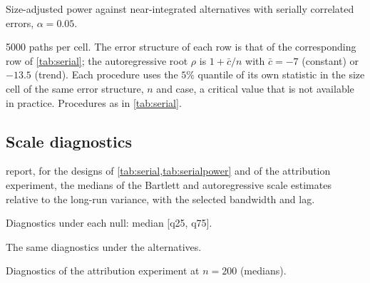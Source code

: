 \documentclass[11pt]{article}
\newcommand{\cbar}{\bar{c}}
\begin{document}
\begin{table}[h]
\centering
\caption{Size-adjusted power against near-integrated alternatives with
serially correlated errors, $\alpha = 0.05$.}
\label{tab:serialpower}
\footnotesize
\resizebox{\textwidth}{!}{%
}
\par\medskip\begin{minipage}{\textwidth}\footnotesize
5000 paths per cell. The error structure of each row is that of the
corresponding row of \cref{tab:serial}; the autoregressive root $\rho$ is
$1 + \cbar/n$ with $\cbar = -7$ (constant) or $-13.5$ (trend). Each
procedure uses the $5\%$ quantile of its own statistic in the size cell
of the same error structure, $n$ and case, a critical value that is not
available in practice. Procedures as in \cref{tab:serial}.
\end{minipage}
\end{table}

\subsection*{Scale diagnostics}

 report, for the designs of \cref{tab:serial,tab:serialpower} and of the attribution experiment, the medians of the Bartlett and autoregressive scale estimates relative to the long-run variance, with the selected bandwidth and lag.

\begin{table}[htbp]
\centering
\caption{Diagnostics under each null: median [q25, q75].}
\label{tab:diagnull}
\small
\begin{adjustbox}{max width=\textwidth}

\end{adjustbox}
\end{table}

\begin{table}[htbp]
\centering
\caption{The same diagnostics under the alternatives.}
\label{tab:diagalt}
\small
\begin{adjustbox}{max width=\textwidth}

\end{adjustbox}
\end{table}

\begin{table}[htbp]
\centering
\caption{Diagnostics of the attribution experiment at $n = 200$ (medians).}
\label{tab:diagattrib}
\small
\begin{adjustbox}{max width=\textwidth}

\end{adjustbox}
\end{table}
\end{document}
